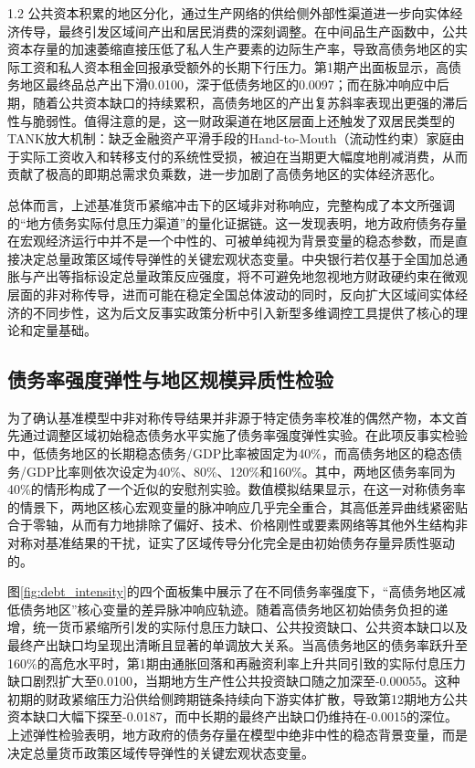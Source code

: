 \documentclass[12pt,UTF8]{ctexart}
\begin{document}
\begin{spacing}{1.2}
		公共资本积累的地区分化，通过生产网络的供给侧外部性渠道进一步向实体经济传导，最终引发区域间产出和居民消费的深刻调整。在中间品生产函数中，公共资本存量的加速萎缩直接压低了私人生产要素的边际生产率，导致高债务地区的实际工资和私人资本租金回报承受额外的长期下行压力。第1期产出面板显示，高债务地区最终品总产出下滑0.0100，深于低债务地区的0.0097；而在脉冲响应中后期，随着公共资本缺口的持续累积，高债务地区的产出复苏斜率表现出更强的滞后性与脆弱性。值得注意的是，这一财政渠道在地区层面上还触发了双居民类型的TANK放大机制：缺乏金融资产平滑手段的Hand-to-Mouth（流动性约束）家庭由于实际工资收入和转移支付的系统性受损，被迫在当期更大幅度地削减消费，从而贡献了极高的即期总需求负乘数，进一步加剧了高债务地区的实体经济恶化。
		
		总体而言，上述基准货币紧缩冲击下的区域非对称响应，完整构成了本文所强调的“地方债务实际付息压力渠道”的量化证据链。这一发现表明，地方政府债务存量在宏观经济运行中并不是一个中性的、可被单纯视为背景变量的稳态参数，而是直接决定总量政策区域传导弹性的关键宏观状态变量。中央银行若仅基于全国加总通胀与产出等指标设定总量政策反应强度，将不可避免地忽视地方财政硬约束在微观层面的非对称传导，进而可能在稳定全国总体波动的同时，反向扩大区域间实体经济的不同步性，这为后文反事实政策分析中引入新型多维调控工具提供了核心的理论和定量基础。

		\subsection{债务率强度弹性与地区规模异质性检验}
		
		为了确认基准模型中非对称传导结果并非源于特定债务率校准的偶然产物，本文首先通过调整区域初始稳态债务水平实施了债务率强度弹性实验。在此项反事实检验中，低债务地区的长期稳态债务/GDP比率被固定为40\%，而高债务地区的稳态债务/GDP比率则依次设定为40\%、80\%、120\%和160\%。其中，两地区债务率同为40\%的情形构成了一个近似的安慰剂实验。数值模拟结果显示，在这一对称债务率的情景下，两地区核心宏观变量的脉冲响应几乎完全重合，其高低差异曲线紧密贴合于零轴，从而有力地排除了偏好、技术、价格刚性或要素网络等其他外生结构非对称对基准结果的干扰，证实了区域传导分化完全是由初始债务存量异质性驱动的。
		
		图\ref{fig:debt_intensity}的四个面板集中展示了在不同债务率强度下，“高债务地区减低债务地区”核心变量的差异脉冲响应轨迹。随着高债务地区初始债务负担的递增，统一货币紧缩所引发的实际付息压力缺口、公共投资缺口、公共资本缺口以及最终产出缺口均呈现出清晰且显著的单调放大关系。当高债务地区的债务率跃升至160\%的高危水平时，第1期由通胀回落和再融资利率上升共同引致的实际付息压力缺口剧烈扩大至0.0100，当期地方生产性公共投资缺口随之加深至-0.00055。这种初期的财政紧缩压力沿供给侧跨期链条持续向下游实体扩散，导致第12期地方公共资本缺口大幅下探至-0.0187，而中长期的最终产出缺口仍维持在-0.0015的深位。上述弹性检验表明，地方政府的债务存量在模型中绝非中性的稳态背景变量，而是决定总量货币政策区域传导弹性的关键宏观状态变量。
		

\end{spacing}
\end{document}
